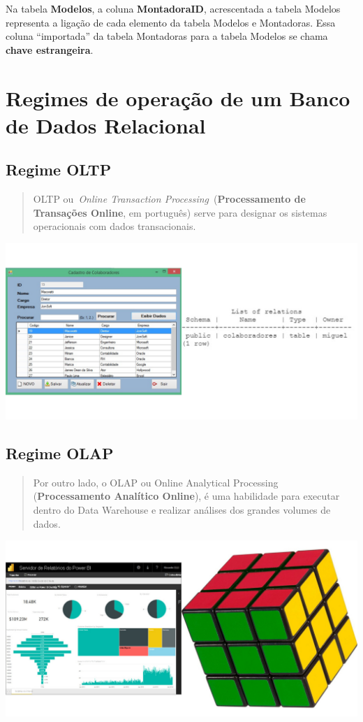 \documentclass[
]{book}
\begin{document}
Na tabela \textbf{Modelos}, a coluna \textbf{MontadoraID}, acrescentada a tabela Modelos representa a ligação de cada elemento da tabela Modelos e Montadoras. Essa coluna ``importada'' da tabela Montadoras para a tabela Modelos se chama \textbf{chave estrangeira}.

\section{Regimes de operação de um Banco de Dados Relacional}\label{regimes-de-operauxe7uxe3o-de-um-banco-de-dados-relacional}

\subsection{Regime OLTP}\label{regime-oltp}

\begin{quote}
OLTP ou~\emph{Online Transaction Processing}~(\textbf{Processamento de Transações Online}, em português) serve para designar os sistemas operacionais com dados transacionais.~
\end{quote}

\includegraphics{images/5-bi/08-crud3.jpg}

\subsection{Regime OLAP}\label{regime-olap}

\begin{quote}
Por outro lado, o OLAP ou Online Analytical Processing (\textbf{Processamento Analítico Online}), é uma habilidade para executar dentro do Data Warehouse e realizar análises dos grandes volumes de dados.
\end{quote}

\includegraphics{images/5-bi/09-cubo3.jpg}
\end{document}
